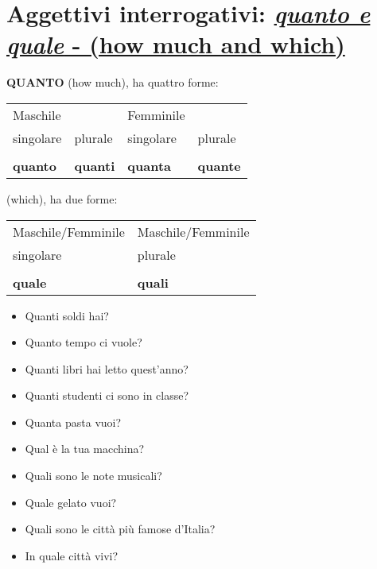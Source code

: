 \documentclass[letter,11pt]{article}
\begin{document}
\vskip 0.5in

\section*{Aggettivi interrogativi:
\underline{\emph{quanto e quale} - (how much and which)}}
\vskip 0.2in

{\bf QUANTO} (how much), ha quattro forme:
\vskip 0.2in

\noindent \begin{tabular}{ |p{3cm}| p{3cm}| p{3cm}| p{3cm}|}
    Maschile  &  &   Femminile &  \\
    singolare & plurale &   singolare & plurale  \\
    \hline
    \hline
     &  &    &  \\ \hline
    {\bf quanto }  & {\bf quanti} &    {\bf quanta} & {\bf quante}   \\ \hline
    \hline
\end{tabular}

\vskip 0.2in

 (which), ha due forme:
\vskip 0.2in

\noindent \begin{tabular}{ |p{5cm}| p{5cm}| }
    Maschile/Femminile  &  Maschile/Femminile   \\
    singolare & plurale   \\
    \hline
    \hline
     &    \\ \hline
    {\bf quale}  & {\bf quali}   \\ \hline
    \hline
\end{tabular}

\vskip 0.5in

\begin{multicols}{2}
\begin{itemize}
    \item Quanti soldi hai?
    \item Quanto tempo ci vuole?
    \item Quanti libri hai letto quest'anno?
    \item Quanti studenti ci sono in classe?
    \item Quanta pasta vuoi?
    \item Qual è la tua macchina?
    \item Quali sono le note musicali?
    \item Quale gelato vuoi?
    \item Quali sono le città più famose d'Italia?
    \item In quale città vivi?


\end{itemize}
\end{multicols}
\end{document}
